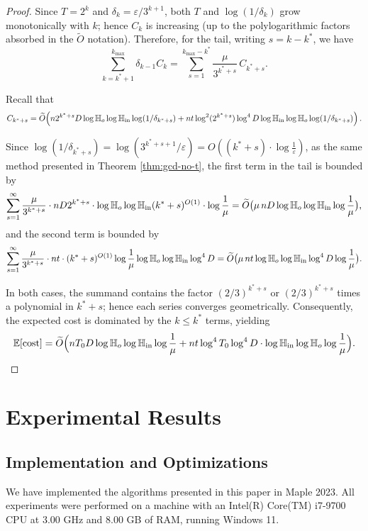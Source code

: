 \documentclass{article}
\numberwithin{equation}{section}
\begin{document}
\begin{proof}
Since $T = 2^k$ and $\delta_k = \varepsilon / 3^{k+1}$, both $T$ and $\log(1/\delta_k)$ grow monotonically with $k$; hence $C_k$ is increasing (up to the polylogarithmic factors absorbed in the $\widetilde{O}$ notation). Therefore,
for the tail, writing $s = k - k^*$, we have
\[
\sum_{k=k^*+1}^{k_{\max}} \delta_{k-1} C_k
=  \sum_{s=1}^{k_{\max}-k^*} \frac{\mu}{3^{k^*+s}} \, C_{k^*+s}.
\]

Recall that
\[
C_{k^*+s} = \widetilde{O}\!\left(
n 2^{k^*+s} D\log\mathbb{H}_{o}\log\mathbb{H}_{\rm in} \log(1/\delta_{k^*+s})
+ nt \log^2(2^{k^*+s}) \log^4 D \log \mathbb{H}_{\rm in} \log\mathbb{H}_{o}\log(1/\delta_{k^*+s})
\right).
\]

Since $\log(1/\delta_{k^*+s}) = \log(3^{k^*+s+1}/\varepsilon) = O((k^*+s)\cdot \log\frac{1}{\varepsilon})$, as the same method presented in Theorem \ref{thm:gcd-no-t},
%
the first term in the tail is bounded by
\[
\sum_{s=1}^{\infty}  \frac{\mu}{3^{k^*+s}}
\cdot n D 2^{k^*+s}
\cdot \log\mathbb{H}_{o}\log\mathbb{H}_{\rm in} (k^*+s)^{O(1)}\cdot\log\frac{1}{\mu}
= \widetilde{O}\bigl(\mu \, n D \log\mathbb{H}_{o}\log\mathbb{H}_{\rm in} \log\frac{1}{\mu}\bigr),
\]
and the second term is bounded by
\[
\sum_{s=1}^{\infty} \frac{\mu}{3^{k^*+s}}
\cdot nt
\cdot (k^*+s)^{O(1)}\log\frac{1}{\mu} \log\mathbb{H}_{o}\log\mathbb{H}_{\rm in} \log^4 D
= \widetilde{O}\bigl(\mu \, nt \log\mathbb{H}_{o}\log\mathbb{H}_{\rm in} \log^4 D \log\frac{1}{\mu}\bigr).
\]

In both cases, the summand contains the factor $(2/3)^{k^*+s}$ or $(2/3)^{k^*+s}$ times a polynomial in $k^*+s$; hence each series converges geometrically. Consequently, the expected cost is dominated by the $k \le k^*$ terms, yielding
\[
\mathbb{E}[\text{cost}]
= \widetilde{O}\Bigl( 
nT_0 D\log\mathbb{H}_{o}\log\mathbb{H}_{\rm in}\log\frac{1}{\mu}
+ n t \log^4 T_0\log^4 D \cdot \log \mathbb{H}_{\rm in} \log\mathbb{H}_{o}\log\frac{1}{\mu}
\Bigr).
\]
\end{proof}

\section{Experimental Results}
\label{sec:experiments}

\subsection{Implementation and Optimizations}


We have implemented the algorithms presented in this paper in Maple 2023. 
All experiments were performed on a machine with an Intel(R) Core(TM) i7-9700 CPU at 3.00 GHz and 8.00 GB of RAM, running Windows 11.
\end{document}

